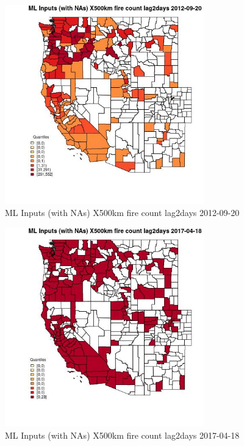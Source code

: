 \clearpage 

\begin{figure} 
\centering  
\includegraphics[width=0.77\textwidth]{Code_Outputs/Report_ML_input_PM25_Step4_part_e_de_duplicated_aves_compiled_2019-05-14wNAs_CountyX500km_fire_count_lag2daysMean2012-09-20_2012-09-20.jpg} 
\caption{\label{fig:Report_ML_input_PM25_Step4_part_e_de_duplicated_aves_compiled_2019-05-14wNAsCountyX500km_fire_count_lag2daysMean2012-09-20_2012-09-20}ML Inputs (with NAs) X500km fire count lag2days 2012-09-20} 
\end{figure} 
 

\begin{figure} 
\centering  
\includegraphics[width=0.77\textwidth]{Code_Outputs/Report_ML_input_PM25_Step4_part_e_de_duplicated_aves_compiled_2019-05-14wNAs_CountyX500km_fire_count_lag2daysMean2017-04-18_2017-04-18.jpg} 
\caption{\label{fig:Report_ML_input_PM25_Step4_part_e_de_duplicated_aves_compiled_2019-05-14wNAsCountyX500km_fire_count_lag2daysMean2017-04-18_2017-04-18}ML Inputs (with NAs) X500km fire count lag2days 2017-04-18} 
\end{figure} 
 

